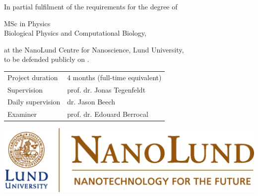 {\begin{titlepage}
\begin{center}
		In partial fulfilment of the requirements for the degree of 
		
		\bigskip
		
		{MSc in Physics} \\
		Biological Physics and Computational Biology,
		
		\bigskip
		
		at the NanoLund Centre for Nanoscience, Lund University,\\
		to be defended publicly on .
		
		
		\vspace{5cm}
		
		\vfill
		\begin{tabular}{ll}
			Project duration & 4 months (full-time equivalent)\\
			Supervision & prof. dr. Jonas Tegenfeldt\\
			Daily supervision & dr. Jason Beech\\
			Examiner & prof. dr. Edouard Berrocal
		\end{tabular}
	
		\vspace{3cm}
		
		\includegraphics[width=0.5\linewidth]{layout/nanolund logotype.eps}
	
	
	\end{center}
\end{titlepage}
}